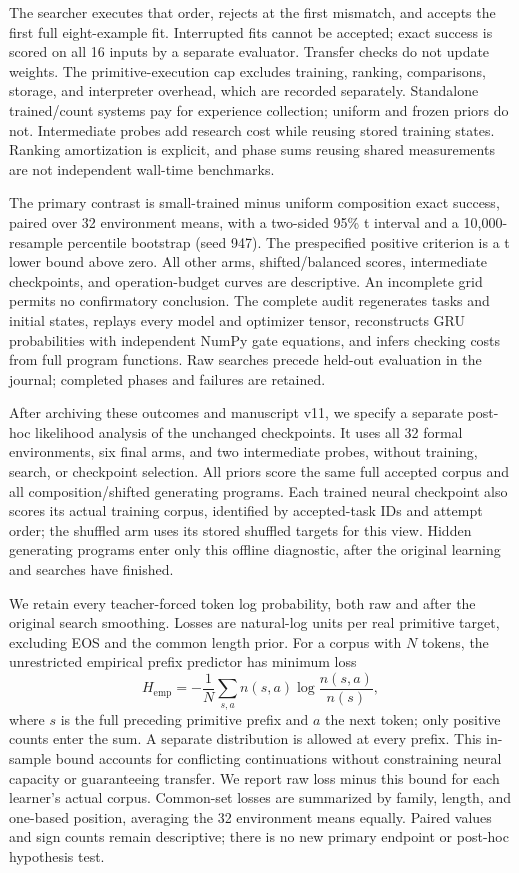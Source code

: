 \documentclass[11pt]{article}
\begin{document}
The searcher executes that order, rejects at the first mismatch, and accepts
the first full eight-example fit. Interrupted fits cannot be accepted; exact
success is scored on all 16 inputs by a separate evaluator. Transfer checks
do not update weights. The primitive-execution cap excludes training, ranking,
comparisons, storage, and interpreter overhead, which are recorded separately.
Standalone trained/count systems pay for experience collection; uniform and
frozen priors do not. Intermediate probes add research cost while reusing
stored training states. Ranking amortization is explicit, and phase sums
reusing shared measurements are not independent wall-time benchmarks.

The primary contrast is small-trained minus uniform composition exact success,
paired over 32 environment means, with a two-sided 95\% t interval and a
10,000-resample percentile bootstrap (seed 947). The prespecified positive
criterion is a t lower bound above zero. All other arms, shifted/balanced
scores, intermediate checkpoints, and operation-budget curves are descriptive.
An incomplete grid permits no confirmatory conclusion. The complete audit
regenerates tasks and initial states, replays every model and optimizer tensor,
reconstructs GRU probabilities with independent NumPy gate equations, and
infers checking costs from full program functions. Raw searches precede held-out
evaluation in the journal; completed phases and failures are retained.

After archiving these outcomes and manuscript v11, we specify a separate
post-hoc likelihood analysis of the unchanged checkpoints. It uses all 32
formal environments, six final arms, and two intermediate probes, without
training, search, or checkpoint selection. All priors score the same full
accepted corpus and all composition/shifted generating programs. Each trained
neural checkpoint also scores its actual training corpus, identified by
accepted-task IDs and attempt order; the shuffled arm uses its stored shuffled
targets for this view. Hidden generating programs enter only this offline
diagnostic, after the original learning and searches have finished.

We retain every teacher-forced token log probability, both raw and after the
original search smoothing. Losses are natural-log units per real primitive
target, excluding EOS and the common length prior. For a corpus with $N$
tokens, the unrestricted empirical prefix predictor has minimum loss
\[
 H_{\mathrm{emp}}=-\frac{1}{N}\sum_{s,a}n(s,a)
       \log\frac{n(s,a)}{n(s)},
\]
where $s$ is the full preceding primitive prefix and $a$ the next token;
only positive counts enter the sum. A separate distribution is allowed at
every prefix. This in-sample bound accounts for conflicting continuations
without constraining neural capacity or guaranteeing transfer. We report raw
loss minus this bound for each learner's actual corpus. Common-set losses
are summarized by family, length, and one-based position, averaging the 32
environment means equally. Paired values and sign counts remain descriptive;
there is no new primary endpoint or post-hoc hypothesis test.
\end{document}
